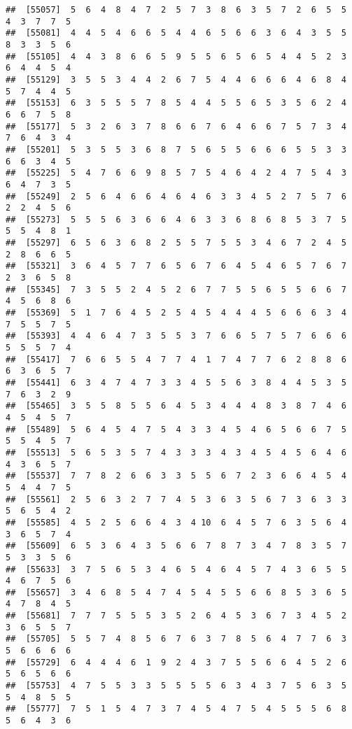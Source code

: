 \documentclass[
]{book}
\begin{document}
\begin{verbatim}
##  [55057]  5  6  4  8  4  7  2  5  7  3  8  6  3  5  7  2  6  5  5  4  3  7  7  5
##  [55081]  4  4  5  4  6  6  5  4  4  6  5  6  6  3  6  4  3  5  5  8  3  3  5  6
##  [55105]  4  4  3  8  6  6  5  9  5  5  6  5  6  5  4  4  5  2  3  6  4  4  5  4
##  [55129]  3  5  5  3  4  4  2  6  7  5  4  4  6  6  6  4  6  8  4  5  7  4  4  5
##  [55153]  6  3  5  5  5  7  8  5  4  4  5  5  6  5  3  5  6  2  4  6  6  7  5  8
##  [55177]  5  3  2  6  3  7  8  6  6  7  6  4  6  6  7  5  7  3  4  7  6  4  3  4
##  [55201]  5  3  5  5  3  6  8  7  5  6  5  5  6  6  6  5  5  3  3  6  6  3  4  5
##  [55225]  5  4  7  6  6  9  8  5  7  5  4  6  4  2  4  7  5  4  3  6  4  7  3  5
##  [55249]  2  5  6  4  6  6  4  6  4  6  3  3  4  5  2  7  5  7  6  2  2  4  5  6
##  [55273]  5  5  5  6  3  6  6  4  6  3  3  6  8  6  8  5  3  7  5  5  5  4  8  1
##  [55297]  6  5  6  3  6  8  2  5  5  7  5  5  3  4  6  7  2  4  5  2  8  6  6  5
##  [55321]  3  6  4  5  7  7  6  5  6  7  6  4  5  4  6  5  7  6  7  2  3  6  5  8
##  [55345]  7  3  5  5  2  4  5  2  6  7  7  5  5  6  5  5  6  6  7  4  5  6  8  6
##  [55369]  5  1  7  6  4  5  2  5  4  5  4  4  4  5  6  6  6  3  4  7  5  5  7  5
##  [55393]  4  4  6  4  7  3  5  5  3  7  6  6  5  7  5  7  6  6  6  5  5  5  7  4
##  [55417]  7  6  6  5  5  4  7  7  4  1  7  4  7  7  6  2  8  8  6  6  3  6  5  7
##  [55441]  6  3  4  7  4  7  3  3  4  5  5  6  3  8  4  4  5  3  5  7  6  3  2  9
##  [55465]  3  5  5  8  5  5  6  4  5  3  4  4  4  8  3  8  7  4  6  4  5  4  5  7
##  [55489]  5  6  4  5  4  7  5  4  3  3  4  5  4  6  5  6  6  7  5  5  5  4  5  7
##  [55513]  5  6  5  3  5  7  4  3  3  3  4  3  4  5  4  5  6  4  6  4  3  6  5  7
##  [55537]  7  7  8  2  6  6  3  3  5  5  6  7  2  3  6  6  4  5  4  5  4  4  7  5
##  [55561]  2  5  6  3  2  7  7  4  5  3  6  3  5  6  7  3  6  3  3  5  6  5  4  2
##  [55585]  4  5  2  5  6  6  4  3  4 10  6  4  5  7  6  3  5  6  4  3  6  5  7  4
##  [55609]  6  5  3  6  4  3  5  6  6  7  8  7  3  4  7  8  3  5  7  5  3  3  5  6
##  [55633]  3  7  5  6  5  3  4  6  5  4  6  4  5  7  4  3  6  5  5  4  6  7  5  6
##  [55657]  3  4  6  8  5  4  7  4  5  4  5  5  6  6  8  5  3  6  5  4  7  8  4  5
##  [55681]  7  7  7  5  5  5  3  5  2  6  4  5  3  6  7  3  4  5  2  3  6  5  5  7
##  [55705]  5  5  7  4  8  5  6  7  6  3  7  8  5  6  4  7  7  6  3  5  6  6  6  6
##  [55729]  6  4  4  4  6  1  9  2  4  3  7  5  5  6  6  4  5  2  6  5  6  5  6  6
##  [55753]  4  7  5  5  3  3  5  5  5  5  6  3  4  3  7  5  6  3  5  5  4  8  5  5
##  [55777]  7  5  1  5  4  7  3  7  4  5  4  7  5  4  5  5  5  6  8  5  6  4  3  6

\end{verbatim}
\end{document}
